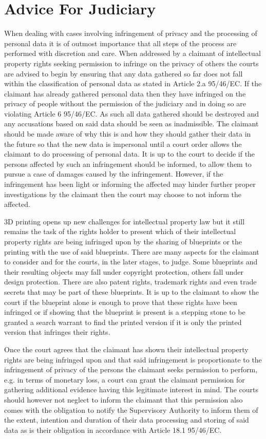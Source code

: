 \section{Advice For Judiciary}
When dealing with cases involving infringement of privacy and the processing of personal data it is of outmost importance that all steps of the process are performed with discretion and care. When addressed by a claimant of intellectual property rights seeking permission to infringe on the privacy of others the courts are advised to begin by ensuring that any data gathered so far does not fall within the classification of personal data as stated in Article 2.a 95/46/EC. If the claimant has already gathered personal data then they have infringed on the privacy of people without the permission of the judiciary and in doing so are violating Article 6 95/46/EC. As such all data gathered should be destroyed and any accusations based on said data should be seen as inadmissible. The claimant should be made aware of why this is and how they should gather their data in the future so that the new data is impersonal until a court order allows the claimant to do processing of personal data. It is up to the court to decide if the persons affected by such an infringement should be informed, to allow them to pursue a case of damages caused by the infringement. However, if the infringement has been light or informing the affected may hinder further proper investigations by the claimant then the court may choose to not inform the affected. 

3D printing opens up new challenges for intellectual property law but it still remains the task of the rights holder to present which of their intellectual property rights are being infringed upon by the sharing of blueprints or the printing with the use of said blueprints. There are many aspects for the claimant to consider and for the courts, in the later stages, to judge. Some blueprints and their resulting objects may fall under copyright protection, others fall under design protection. There are also patent rights, trademark rights and even trade secrets that may be part of these blueprints. It is up to the claimant to show the court if the blueprint alone is enough to prove that these rights have been infringed or if showing that the blueprint is present is a stepping stone to be granted a search warrant to find the printed version if it is only the printed version that infringes their rights.

Once the court agrees that the claimant has shown their intellectual property rights are being infringed upon and that said infringement is proportionate to the infringement of privacy of the persons the claimant seeks permission to perform, e.g. in terms of monetary loss, a court can grant the claimant permission for gathering additional evidence having this legitimate interest in mind. The courts should however not neglect to inform the claimant that this permission also comes with the obligation to notify the Supervisory Authority to inform them of the extent, intention and duration of their data processing and storing of said data as is their obligation in accordance with Article 18.1 95/46/EC.

